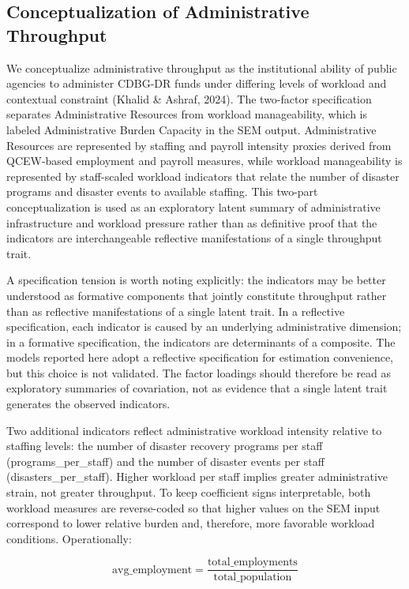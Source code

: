 \documentclass[
  number]{elsarticle}
\begin{document}
\subsection{Conceptualization of Administrative
Throughput}\label{conceptualization-of-administrative-throughput}

We conceptualize administrative throughput as the institutional ability
of public agencies to administer CDBG-DR funds under differing levels of
workload and contextual constraint (Khalid \& Ashraf, 2024). The
two-factor specification separates Administrative Resources from
workload manageability, which is labeled Administrative Burden Capacity
in the SEM output. Administrative Resources are represented by staffing
and payroll intensity proxies derived from QCEW-based employment and
payroll measures, while workload manageability is represented by
staff-scaled workload indicators that relate the number of disaster
programs and disaster events to available staffing. This two-part
conceptualization is used as an exploratory latent summary of
administrative infrastructure and workload pressure rather than as
definitive proof that the indicators are interchangeable reflective
manifestations of a single throughput trait.

A specification tension is worth noting explicitly: the indicators may
be better understood as formative components that jointly constitute
throughput rather than as reflective manifestations of a single latent
trait. In a reflective specification, each indicator is caused by an
underlying administrative dimension; in a formative specification, the
indicators are determinants of a composite. The models reported here
adopt a reflective specification for estimation convenience, but this
choice is not validated. The factor loadings should therefore be read as
exploratory summaries of covariation, not as evidence that a single
latent trait generates the observed indicators.

Two additional indicators reflect administrative workload intensity
relative to staffing levels: the number of disaster recovery programs
per staff (programs\_per\_staff) and the number of disaster events per
staff (disasters\_per\_staff). Higher workload per staff implies greater
administrative strain, not greater throughput. To keep coefficient signs
interpretable, both workload measures are reverse-coded so that higher
values on the SEM input correspond to lower relative burden and,
therefore, more favorable workload conditions. Operationally:

\[\text{avg\_employment} = \frac{\text{total\_employments}}{\text{total\_population}}\]
\end{document}
